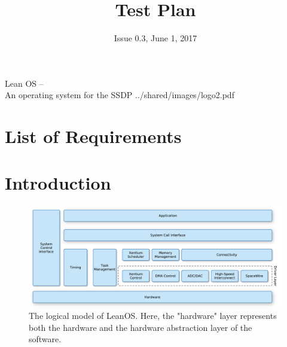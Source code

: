 

\title{Test Plan}
\def \documentid {LEANOS-UVIE-TP-001}
\date{Issue 0.3, June 1, 2017}

\newcommand\affil[1]{\textsuperscript#1}

\def\preparedby {Armin Luntzer\affil{1}}
\def\checkedby {Roland Ottensamer\affil{1}}
\def\approvedby {Franz Kerschbaum\affil{1}}

\def\affiliations{
	\affil{1} Department of Astrophysics, University of Vienna
}









\usepackage{vhistory}

\usepackage{biblatex}


\rereadauxrequirementlabels

\exportrequirements





\setmainfont{MyriadPro-SemiCondensed}
\uvietitlepage%
{Lean OS --\\ An operating system for the SSDP}%
{\doctitle}%
{../shared/images/logo2.pdf}
\setmainfont{MyriadPro}

\approvalpage

\tableofcontents
\newpage


\chapter*{List of Requirements}
\the\requirementlist


\begin{versionhistory}
\end{versionhistory}


\chapter{Introduction}

\begin{figure}[htb]
\begin{center}
	\includegraphics[width=\columnwidth]{../requirements/images/OS_logical}
	\caption{The logical model of LeanOS. Here, the "hardware" layer
	represents both the hardware and the hardware abstraction layer of
	the software.}
	\label{fig:logical_model}
\end{center}
\end{figure}

